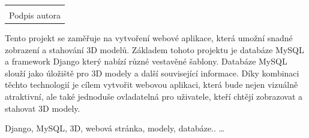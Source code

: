 \documentclass[12pt, a4paper,
twoside,        %
openright
]{report}
\newcommand\datumOdevzdani{1. 1. 2024} %
\begin{document}
	\vspace*{0.7\textheight} %

	\vfill
	\noindent{V Opavě \datumOdevzdani\\}
	\noindent
	\begin{minipage}{\linewidth}
		\hspace{9.5cm} 
		\begin{tabular}{@{}p{6cm}@{}}
			\dotfill \\
			Podpis autora
		\end{tabular}
	\end{minipage}
	
	


	\noindent Tento projekt se zaměřuje na vytvoření webové aplikace, která umožní snadné zobrazení a stahování 3D modelů. Základem tohoto projektu je databáze MySQL a framework Django který nabízí různé vestavěné šablony. Databáze MySQL slouží jako úložiště pro 3D modely a další související informace. Díky kombinaci těchto technologií je cílem vytvořit webovou aplikaci, která bude nejen vizuálně atraktivní, ale také jednoduše ovladatelná pro uživatele, kteří chtějí zobrazovat a stahovat 3D modely. \\
	\vspace{18pt}
	
	
	\noindent Django, MySQL, 3D, webová stránka, modely, databáze.. \dots 
	
	\vspace{18pt}
	
	\clearpage %
	\tableofcontents
	
\end{document}
